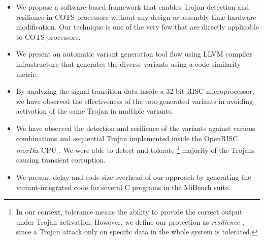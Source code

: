 \documentclass[conference]{IEEEtran}
\begin{document}
\begin{itemize}
	\item We propose a software-based framework that enables Trojan detection and resilience in COTS processors without any design or assembly-time hardware modification. Our technique is one of the very few that are directly applicable to COTS processors. %
	\item We present an automatic variant generation tool flow using LLVM compiler infrastructure that generates %
	the diverse variants using a code similarity metric. 
	\item By analyzing the signal transition data inside a 32-bit RISC microprocessor, we have observed the effectiveness of the tool-generated variants in avoiding activation of the same Trojan in multiple variants. 
	
	\item We have observed the detection and resilience of the variants against various combinations and sequential Trojan implemented inside the OpenRISC \textit{mor1kx} CPU \cite{mor1kx}. 
	We were able to detect and tolerate
	\footnote{In our context, tolerance means the ability to provide the correct output under Trojan activation. However, we define our protection as \textit{resilience} \cite{tolerance}, since a Trojan attack only on specific data in the whole system is tolerated.} 
	majority of the Trojans causing transient corruption.  
	
	\item We present delay and code size overhead of our approach by generating the variant-integrated code for several C programs in the MiBench suite. 
	
\end{itemize}
\end{document}
